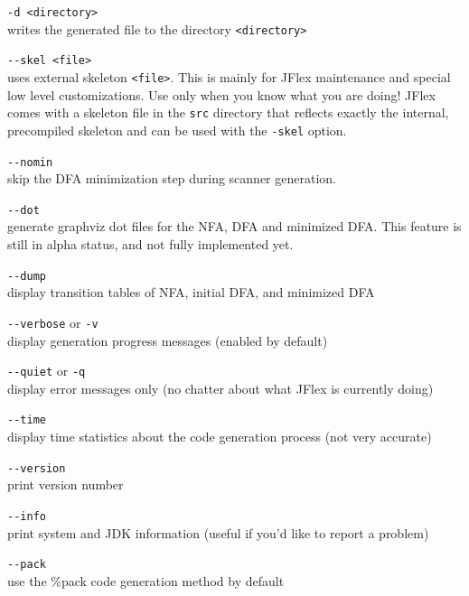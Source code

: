\documentclass[11pt]{scrartcl}
\begin{document}
\begin{description}
\item \verb+-d <directory>+\\
  writes the generated file to the directory \verb+<directory>+
  

\item \verb+--skel <file>+\\
  uses external skeleton \verb+<file>+. This is mainly for JFlex
  maintenance and special low level customizations. Use only when you
  know what you are doing! JFlex comes with a skeleton file in the
  \texttt{src} directory that reflects exactly the internal, precompiled
  skeleton and can be used with the \texttt{-skel} option.

\item \verb+--nomin+\\
  skip the DFA minimization step during scanner generation.

\item \verb+--dot+\\
  generate graphviz dot files for the NFA, DFA and minimized 
  DFA. This feature is still in alpha status, and not
  fully implemented yet. 

\item \verb+--dump+\\
  display transition tables of NFA, initial DFA, and minimized DFA 

\item \verb+--verbose+ or \texttt{-v}\\
  display generation progress messages (enabled by default)

\item \verb+--quiet+ or \texttt{-q}\\
  display error messages only (no chatter about what JFlex is
  currently doing)

\item \verb+--time+\\
  display time statistics about the code generation process
  (not very accurate)

\item \verb+--version+\\
  print version number 

\item \verb+--info+\\
  print system and JDK information (useful if you'd like
  to report a problem)

\item \verb+--pack+\\
  use the \%pack code generation method by default


\end{description}
\end{document}

